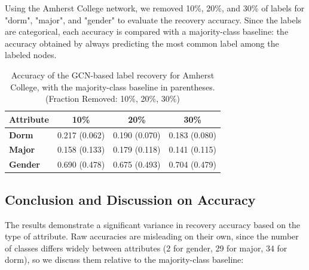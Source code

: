 \documentclass[12pt]{article}
\begin{document}
Using the Amherst College network, we removed 10\%, 20\%, and 30\% of labels for "dorm", "major", and "gender" to evaluate the recovery accuracy. Since the labels are categorical, each accuracy is compared with a majority-class baseline: the accuracy obtained by always predicting the most common label among the labeled nodes.

\begin{table}[h!]
    \centering
    \small
    \begin{tabular}{|l|c|c|c|}
        \hline
        \textbf{Attribute} & \textbf{10\%} & \textbf{20\%} & \textbf{30\%} \\ \hline
        \textbf{Dorm}      & 0.217 (0.062) & 0.190 (0.070) & 0.183 (0.080) \\ \hline
        \textbf{Major}     & 0.158 (0.133) & 0.179 (0.118) & 0.141 (0.115) \\ \hline
        \textbf{Gender}    & 0.690 (0.478) & 0.675 (0.493) & 0.704 (0.479) \\ \hline
    \end{tabular}
    \caption{Accuracy of the GCN-based label recovery for Amherst College, with the majority-class baseline in parentheses. (Fraction Removed: 10\%, 20\%, 30\%)}
    \label{tab:label_propagation_results}
\end{table}

\subsection*{Conclusion and Discussion on Accuracy}

The results demonstrate a significant variance in recovery accuracy based on the type of attribute. Raw accuracies are misleading on their own, since the number of classes differs widely between attributes (2 for gender, 29 for major, 34 for dorm), so we discuss them relative to the majority-class baseline:
\end{document}
